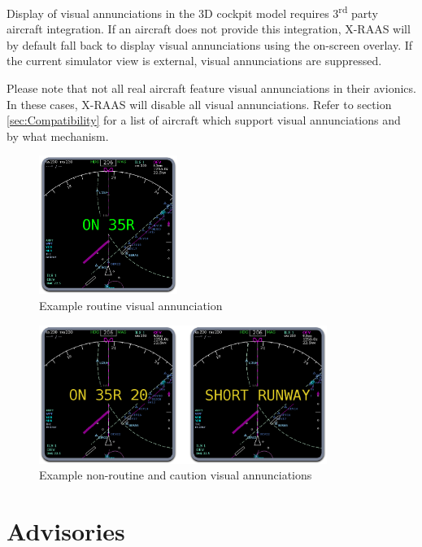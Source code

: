 \documentclass[a4paper,12pt]{article}
\begin{document}
\noindent Display of visual annunciations in the 3D cockpit model
requires 3\textsuperscript{rd} party aircraft integration. If an
aircraft does not provide this integration, X-RAAS will by default fall
back to display visual annunciations using the on-screen overlay. If the
current simulator view is external, visual annunciations are suppressed.

Please note that not all real aircraft feature visual annunciations in
their avionics. In these cases, X-RAAS will disable all visual
annunciations. Refer to section \ref{sec:Compatibility} for a
list of aircraft which support visual annunciations and by what
mechanism.

\begin{figure}[H]
\begin{center}
\includegraphics[height=4.5cm]{../src/sample_ND_routine.png}
\end{center}
\caption{Example routine visual annunciation}
\label{fig:RoutineVisual}
\end{figure}

\begin{figure}[H]
\begin{center}
\vspace{2em}
\includegraphics[height=4.5cm]{../src/sample_ND_alert.png}
\end{center}
\caption{Example non-routine and caution visual annunciations}
\label{fig:NonroutineVisual}
\end{figure}

\newpage

\section{Advisories}
\end{document}
